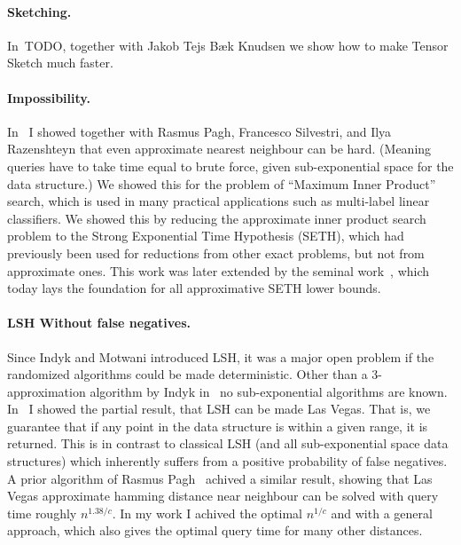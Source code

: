 \documentclass[10pt]{article}
\begin{document}
\paragraph{Sketching.} In~TODO, together with Jakob Tejs Bæk Knudsen we show how to make Tensor Sketch much faster.

\paragraph{Impossibility.} In~\cite{ahle2016complexity} I showed together with Rasmus Pagh, Francesco Silvestri, and Ilya Razenshteyn that even approximate nearest neighbour can be hard. (Meaning queries have to take time equal to brute force, given sub-exponential space for the data structure.) We showed this for the problem of “Maximum Inner Product” search, which is used in many practical applications such as multi-label linear classifiers.
We showed this by reducing the approximate inner product search problem to the Strong Exponential Time Hypothesis (SETH), which had previously been used for reductions from other exact problems, but not from approximate ones.
This work was later extended by the seminal work~\cite{DBLP:journals/corr/AbboudR17}, which today lays the foundation for all approximative SETH lower bounds.

\paragraph{LSH Without false negatives.} Since Indyk and Motwani introduced LSH, it was a major open problem if the randomized algorithms could be made deterministic. Other than a 3-approximation algorithm by Indyk in~\cite{indyk2007uncertainty} no sub-exponential algorithms are known. In~\cite{ahle2017optimal} I showed the partial result, that LSH can be made Las Vegas. That is, we guarantee that if any point in the data structure is within a given range, it is returned.
This is in contrast to classical LSH (and all sub-exponential space data structures) which inherently suffers from a positive probability of false negatives.
A prior algorithm of Rasmus Pagh~\cite{pagh2016locality} achived a similar result, showing that Las Vegas approximate hamming distance near neighbour can be solved with query time roughly $n^{1.38/c}$.
In my work I achived the optimal $n^{1/c}$ and with a general approach, which also gives the optimal query time for many other distances.
\end{document}

